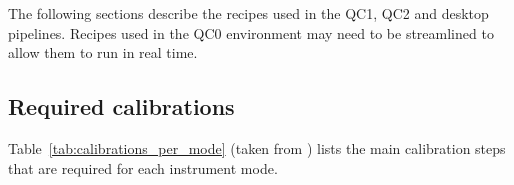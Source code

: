 The following sections describe the recipes used in the QC1, QC2 and
desktop pipelines. Recipes used in the QC0 environment may need to be
streamlined to allow them to run in real time.


\subsection{Required calibrations}
\label{ssec:calibrations}

Table~\ref{tab:calibrations_per_mode} (taken from
\cite{METIS-calibration_plan}) lists the main calibration steps that
are required for each instrument mode.


